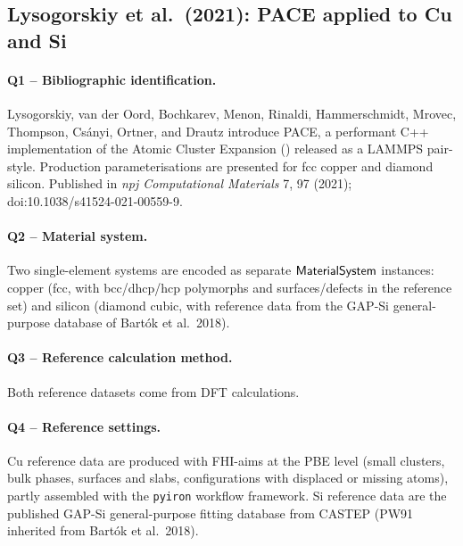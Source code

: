 \subsection{Lysogorskiy et al.\ (2021): PACE applied to Cu and Si}
\label{sec:appendix-example-lysogorskiy2021ace}

\paragraph{Q1 -- Bibliographic identification.}
Lysogorskiy, van der Oord, Bochkarev, Menon, Rinaldi, Hammerschmidt,
Mrovec, Thompson, Cs\'anyi, Ortner, and Drautz introduce PACE, a
performant C++ implementation of the Atomic Cluster Expansion
(\cite{drautz2019ace}) released as a LAMMPS pair-style. Production
parameterisations are presented for fcc copper and diamond silicon.
Published in \emph{npj Computational Materials} 7, 97 (2021);
doi:10.1038/s41524-021-00559-9.


\paragraph{Q2 -- Material system.}
Two single-element systems are encoded as separate
$\mathsf{MaterialSystem}$ instances: copper (fcc, with bcc/dhcp/hcp
polymorphs and surfaces/defects in the reference set) and silicon
(diamond cubic, with reference data from the GAP-Si general-purpose
database of Bart\'ok et al.\ 2018).


\paragraph{Q3 -- Reference calculation method.}
Both reference datasets come from DFT calculations.


\paragraph{Q4 -- Reference settings.}
Cu reference data are produced with FHI-aims at the PBE level
(small clusters, bulk phases, surfaces and slabs, configurations
with displaced or missing atoms), partly assembled with the
\texttt{pyiron} workflow framework. Si reference data are the
published GAP-Si general-purpose fitting database from CASTEP
(PW91 inherited from Bart\'ok et al.\ 2018).


